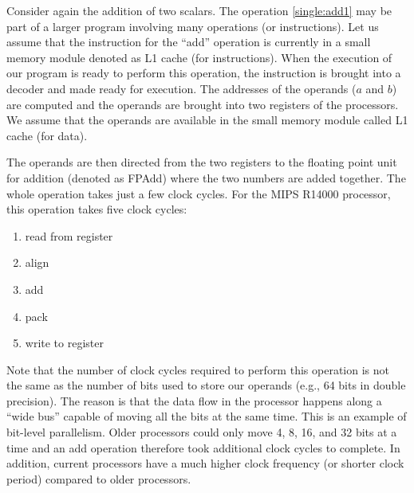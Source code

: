 Consider again the addition of two scalars. The operation \eqref{single:add1}
may be part of a larger program involving many operations (or instructions). Let
us assume that the instruction for the ``add'' operation is currently in a small
memory module denoted as L1 cache (for instructions). When the execution of our
program is ready to perform this operation, the instruction is brought into a
decoder and made ready for execution. The addresses of the operands ($a$ and
$b$) are computed and the operands are brought into two registers of the
processors. We assume that the operands are available in the small memory module
called L1 cache (for data).

The operands are then directed from the two registers to the floating point unit
for addition (denoted as FPAdd) where the two numbers are added together. The
whole operation takes just a few clock cycles. For the MIPS R14000 processor,
this operation takes five clock cycles:
\begin{enumerate}
\item read from register
\item align
\item add
\item pack
\item write to register
\end{enumerate}
Note that the number of clock cycles required to perform this operation is not
the same as the number of bits used to store our operands (e.g., 64 bits in
double precision). The reason is that the data flow in the processor happens
along a ``wide bus'' capable of moving all the bits at the same time. This is an
example of bit-level parallelism. Older processors could only move 4, 8, 16, and
32 bits at a time and an add operation therefore took additional clock cycles to
complete. In addition, current processors have a much higher clock frequency (or
shorter clock period) compared to older processors.

